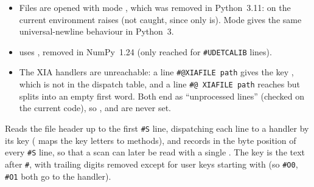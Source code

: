 \begin{issue}
\begin{itemize}[nosep,leftmargin=1em]
\item Files are opened with mode , which was removed in Python~3.11: on the current
  environment  raises  (not caught, since
  only  is).
  Mode  gives the same universal-newline behaviour in Python~3.
\item {} uses , removed in NumPy~1.24 (only reached for
  \texttt{\#UDETCALIB} lines).
\item The XIA handlers are unreachable: a line \texttt{\#@XIAFILE path} gives the key
  , which is not in the dispatch table, and a line \texttt{\#@ XIAFILE path} reaches
   but splits into an empty first word. Both end as ``unprocessed lines''
  (checked on the current code), so ,  and  are never
  set.
\end{itemize}
\end{issue}

Reads the file header up to the first \texttt{\#S} line, dispatching each line to a handler by its
key ( maps the key letters to methods), and records in  the byte
position of every \texttt{\#S} line, so that a scan can later be read with a single .
The key is the text after \texttt{\#}, with trailing digits removed except for user keys starting
with  (so \texttt{\#O0}, \texttt{\#O1} both go to the  handler).

